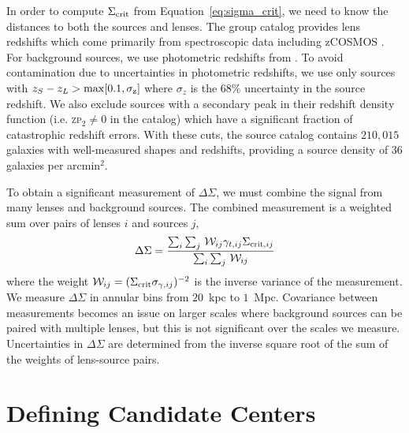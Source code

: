 \documentclass[12pt]{emulateapj}
\begin{document}
In order to compute $\Sigma_{\rm crit}$ from
Equation~\eqref{eq:sigma_crit}, we need to know the distances to
both the sources and lenses. The group catalog provides lens redshifts which
come primarily from spectroscopic data including zCOSMOS \citep[][and
in prep.]{Lilly2009}. For background sources, we use photometric
redshifts from \citet{Ilbert2009}. To avoid contamination due to
uncertainties in photometric redshifts, we use only sources with
$z_S-z_L>\rm{max}[0.1,\sigma_{z}]$ where $\sigma_{z}$ is the $68\%$
uncertainty in the source redshift. We also exclude sources with a
secondary peak in their redshift density function (i.e. \textsc{zp}$_2
\neq 0$ in the \citealt{Ilbert2009} catalog) which have a significant
fraction of catastrophic redshift errors. With these cuts, the source
catalog contains $210,015$ galaxies with well-measured shapes and
redshifts, providing a source density of $36$ galaxies per arcmin$^2$.

To obtain a significant measurement of $\Delta\Sigma$, we must combine
the signal from many lenses and background sources. The combined
measurement is a weighted sum over pairs of lenses $i$ and sources
$j$,
\begin{equation}
\Delta\Sigma=\frac{\sum_i\sum_j\,\mathcal{W}_{ij}\gamma_{t,ij}\Sigma_{{\rm
      crit},ij}}{\sum_i\sum_j\,\mathcal{W}_{ij}}
\label{eq:ds_weighted}
\end{equation}
where the weight $\mathcal{W}_{ij}=(\Sigma_{\rm crit}
\sigma_{\gamma,ij})^{-2}$ is the inverse variance of the measurement.
We measure $\Delta\Sigma$ in annular bins from $20$~{\rm kpc} to
$1$~{\rm Mpc}. Covariance between measurements becomes an issue on
larger scales where background sources can be paired with multiple
lenses, but this is not significant over the scales we
measure. Uncertainties in $\Delta\Sigma$ are determined from the
inverse square root of the sum of the weights of lens-source pairs.



\section{Defining Candidate Centers}
\label{s:centers}
\end{document}
